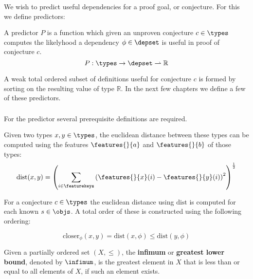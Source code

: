 We wish to predict useful dependencies for a proof goal, or conjecture.
For this we define predictors:

\begin{definition}
  A predictor $P$ is a function which given an unproven conjecture $c \in \types$ 
  computes the likelyhood a dependency $\phi \in \depset$ is useful in proof of conjecture $c$.
  $$
    P : \types \rightarrow \depset \rightharpoonup \mathbb{R}
  $$
\end{definition}

A weak total ordered subset of definitions useful for conjecture $c$ is formed by sorting on the resulting value of type $\mathbb{R}$.
In the next few chapters we define a few of these predictors.

\subsubsection{\knn}


For the \knn predictor several prerequisite definitions are required.

\begin{definition}\label{def:dist}
  Given two types $x, y \in \types$, the euclidean distance between these types can be computed using the features $\features{}{a}$ and $\features{}{b}$ of those types:
  $$ \text{dist}(x, y) = \left( \sum_{i \in \featurekeys} \left( \features{}{x}(i) - \features{}{y}(i) \right)^2 \right)^{\frac{1}{2}} $$
\end{definition}

For a conjecture $c \in \types$ the euclidean distance using $\text{dist}$ is computed for each known \coqobj $s \in \objs$.
A total order of these \coqobjs is constructed using the following ordering:

\begin{definition}
  $$
    \text{closer}_\phi(x, y) = \text{dist}(x, \phi) \leq \text{dist}(y, \phi)
  $$
\end{definition}

\begin{definition}\label{def:infimum}
  Given a partially ordered set $(X, \leq)$,
  the \textbf{infimum} or \textbf{greatest lower bound}, denoted by $\infimum$, is the greatest element in $X$ that is less than or equal to all elements of $X$,
  if such an element exists.
\end{definition}

